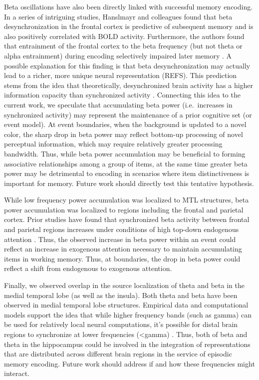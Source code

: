 Beta oscillations have also been directly linked with successful memory
encoding. In a series of intriguing studies, Hanslmayr and colleagues
found that beta desynchronization in the frontal cortex is predictive of
subsequent memory and is also positively correlated with BOLD
activity\autocite{hanslmayr_relationship_2011}. Furthermore, the authors
found that entrainment of the frontal cortex to the beta frequency (but
not theta or alpha entrainment) during encoding selectively impaired
later memory \autocite{hanslmayr_entrainment_2014}. A possible
explanation for this finding is that beta desynchronization may actually
lead to a richer, more unique neural representation (REFS). This
prediction stems from the idea that theoretically, desynchronized brain
activity has a higher information capacity than synchronized activity
\autocite{hanslmayr_oscillations_2016}. Connecting this idea to the
current work, we speculate that accumulating beta power (i.e.~increases
in synchronized activity) may represent the maintenance of a prior
cognitive set (or event model). At event boundaries, when the background
is updated to a novel color, the sharp drop in beta power may reflect
bottom-up processing of novel perceptual information, which may require
relatively greater processing bandwidth. Thus, while beta power
accumulation may be beneficial to forming associative relationships
among a group of items, at the same time greater beta power may be
detrimental to encoding in scenarios where item distinctiveness is
important for memory. Future work should directly test this tentative
hypothesis.

While low frequency power accumulation was localized to MTL structures,
beta power accumulation was localized to regions including the frontal
and parietal cortex. Prior studies have found that synchronized beta
activity between frontal and parietal regions increases under conditions
of high top-down endogenous attention \autocite{buschman_top-down_2007}.
Thus, the observed increase in beta power within an event could reflect
an increase in exogenous attention necessary to maintain accumulating
items in working memory. Thus, at boundaries, the drop in beta power
could reflect a shift from endogenous to exogenous attention.

Finally, we observed overlap in the source localization of theta and
beta in the medial temporal lobe (as well as the insula). Both theta and
beta have been observed in medial temporal lobe structures. Empirical
data and computational models support the idea that while higher
frequency bands (such as gamma) can be used for relatively local neural
computations, it's possible for distal brain regions to synchronize at
lower frequencies (\textless{}gamma) \autocite{kopel}. Thus, both of
beta and theta in the hippocampus could be involved in the integration
of representations that are distributed across different brain regions
in the service of episodic memory encoding. Future work should address
if and how these frequencies might interact.
